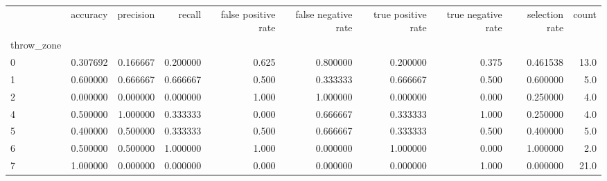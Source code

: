 \begin{tabular}{lrrrrrrrrr}
\toprule
{} &  accuracy &  precision &    recall &  false positive rate &  false negative rate &  true positive rate &  true negative rate &  selection rate &  count \\
throw\_zone &           &            &           &                      &                      &                     &                     &                 &        \\
\midrule
0          &  0.307692 &   0.166667 &  0.200000 &                0.625 &             0.800000 &            0.200000 &               0.375 &        0.461538 &   13.0 \\
1          &  0.600000 &   0.666667 &  0.666667 &                0.500 &             0.333333 &            0.666667 &               0.500 &        0.600000 &    5.0 \\
2          &  0.000000 &   0.000000 &  0.000000 &                1.000 &             1.000000 &            0.000000 &               0.000 &        0.250000 &    4.0 \\
4          &  0.500000 &   1.000000 &  0.333333 &                0.000 &             0.666667 &            0.333333 &               1.000 &        0.250000 &    4.0 \\
5          &  0.400000 &   0.500000 &  0.333333 &                0.500 &             0.666667 &            0.333333 &               0.500 &        0.400000 &    5.0 \\
6          &  0.500000 &   0.500000 &  1.000000 &                1.000 &             0.000000 &            1.000000 &               0.000 &        1.000000 &    2.0 \\
7          &  1.000000 &   0.000000 &  0.000000 &                0.000 &             0.000000 &            0.000000 &               1.000 &        0.000000 &   21.0 \\
\bottomrule
\end{tabular}
